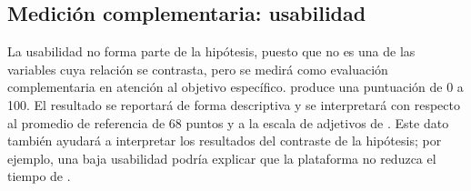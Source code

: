 \subsection{Medición complementaria: usabilidad}

La usabilidad no forma parte de la hipótesis, puesto que no es una de las variables cuya relación se contrasta, pero se medirá como evaluación complementaria en atención al  objetivo específico.  produce una puntuación de 0 a 100. El resultado se reportará de forma descriptiva y se interpretará con respecto al promedio de referencia de 68 puntos \parencite{LewisSauro2018} y a la escala de adjetivos de \textcite{Bangor2008}. Este dato también ayudará a interpretar los resultados del contraste de la hipótesis; por ejemplo, una baja usabilidad podría explicar que la plataforma no reduzca el tiempo de .

\section[Matriz de congruencia]{}


